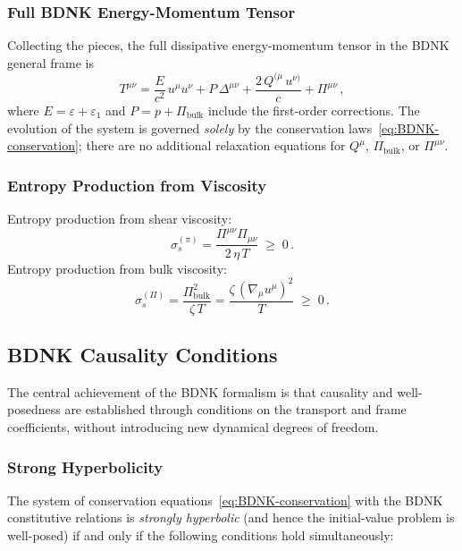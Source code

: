 \subsubsection{Full BDNK Energy-Momentum Tensor}
Collecting the pieces, the full dissipative energy-momentum tensor in
the BDNK general frame is
\begin{equation}
  T^{\mu\nu}
  = \frac{E}{c^{2}}\,u^{\mu}u^{\nu}
    + P\,\Delta^{\mu\nu}
    + \frac{2\,Q^{(\mu}\,u^{\nu)}}{c}
    + \Pi^{\mu\nu}\,,
  \label{eq:BDNK-Tmunu}
\end{equation}
where $E = \varepsilon + \varepsilon_{1}$ and
$P = p + \Pi_{\text{bulk}}$ include the first-order corrections.  The
evolution of the system is governed \emph{solely} by the conservation
laws~\eqref{eq:BDNK-conservation}; there are no additional relaxation
equations for $Q^{\mu}$, $\Pi_{\text{bulk}}$, or $\Pi^{\mu\nu}$.

\subsubsection{Entropy Production from Viscosity}
Entropy production from shear viscosity:
\begin{equation}
  \sigma_{s}^{(\pi)} = \frac{\Pi^{\mu\nu}\Pi_{\mu\nu}}{2\,\eta\,T}
  \;\ge\; 0\,.
  \label{eq:entropy-shear}
\end{equation}
Entropy production from bulk viscosity:
\begin{equation}
  \sigma_{s}^{(\Pi)} = \frac{\Pi_{\text{bulk}}^{2}}{\zeta\,T}
  = \frac{\zeta\,(\nabla_{\mu}u^{\mu})^{2}}{T} \;\ge\; 0\,.
  \label{eq:entropy-bulk}
\end{equation}


\subsection{BDNK Causality Conditions}
\label{subsec:BDNK-causality}

The central achievement of the BDNK formalism is that causality and
well-posedness are established through conditions on the transport
and frame coefficients, without introducing new dynamical degrees
of freedom.

\subsubsection{Strong Hyperbolicity}
The system of conservation equations~\eqref{eq:BDNK-conservation}
with the BDNK constitutive relations is \emph{strongly hyperbolic}
(and hence the initial-value problem is well-posed) if and only if
the following conditions hold simultaneously:

